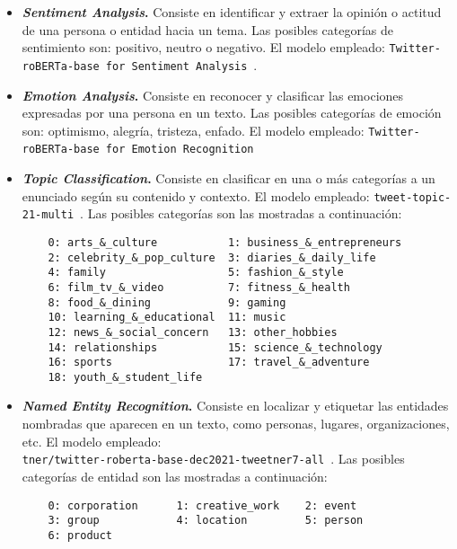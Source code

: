 \begin{itemize}
    \item \textbf{\textit{Sentiment Analysis}.} Consiste en identificar y extraer la opinión o actitud de una persona o entidad hacia un tema. Las posibles categorías de sentimiento son: positivo, neutro o negativo. El modelo empleado: \texttt{Twitter-roBERTa-base for Sentiment Analysis}~\cite{cardiffnlpSentiment,  camacho2022tweetnlp, loureiro2022timelms}.

    \item \textbf{\textit{Emotion Analysis}.} Consiste en reconocer y clasificar las emociones expresadas por una persona en un texto. Las posibles categorías de emoción son: optimismo, alegría, tristeza, enfado. El modelo empleado: \texttt{Twitter-roBERTa-base for Emotion Recognition}~\cite{cardiffnlpEmotion, camacho2022tweetnlp, loureiro2022timelms}

    \item \textbf{\textit{Topic Classification}.} Consiste en clasificar en una o más categorías a un enunciado según su contenido y contexto. El modelo empleado: \texttt{tweet-topic-21-multi}~\cite{cardiffnlpTopic, antypas2022twitter}. Las posibles categorías son las mostradas a continuación:
    \begin{verbatim}
    0: arts_&_culture           1: business_&_entrepreneurs
    2: celebrity_&_pop_culture  3: diaries_&_daily_life
    4: family                   5: fashion_&_style
    6: film_tv_&_video          7: fitness_&_health
    8: food_&_dining            9: gaming
    10: learning_&_educational  11: music
    12: news_&_social_concern   13: other_hobbies
    14: relationships           15: science_&_technology
    16: sports                  17: travel_&_adventure
    18: youth_&_student_life		
    \end{verbatim}

    \item \textbf{\textit{Named Entity Recognition}.} Consiste en localizar y etiquetar las entidades nombradas que aparecen en un texto, como personas, lugares, organizaciones, etc. El modelo empleado:\\\texttt{tner/twitter-roberta-base-dec2021-tweetner7-all}~\cite{tnerNER, ushio2022t, ushio2022named}. Las posibles categorías de entidad son las mostradas a continuación:
    \begin{verbatim}
    0: corporation      1: creative_work    2: event
    3: group            4: location         5: person
    6: product
    \end{verbatim}
    
\end{itemize}


